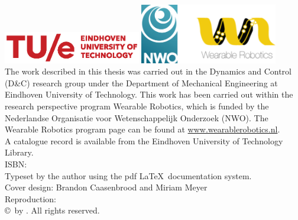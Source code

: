 \thispagestyle{empty}
\vspace*{30mm}\noindent
\begin{center}
{\LARGE\sf\maintitle}\\[4.5cm] %
{\Large\sf \@author}
\end{center}

\newpage
\thispagestyle{empty}

\vspace*{\fill}

\hspace*{-7mm}\includegraphics[width=6cm]{./img/TUeLOG_new.eps} \hspace*{1mm}\includegraphics[width=6cm]{./img/NWO_WR.png}\\[2mm]
{\small The work described in this thesis was carried out in the Dynamics and Control (D\&C) research group under the Department of Mechanical Engineering at Eindhoven University of Technology. This work has been carried out within the research perspective program Wearable Robotics, which is funded by the Nederlandse Organisatie voor Wetenschappelijk Onderzoek (NWO). The Wearable Robotics program page can be found at \url{www.wearablerobotics.nl}.} \\[.5mm]

\noindent\bgroup\small
A catalogue record is available from the Eindhoven University of Technology Library.\\
ISBN: \isbn
\\[4mm]
Typeset by the author using the pdf \LaTeX \ documentation system.\\
Cover design: Brandon Caasenbrood and Miriam Meyer \\
Reproduction: \printer\\[8mm]
\copyright\year\, by \@author. All rights reserved.
}
\egroup

